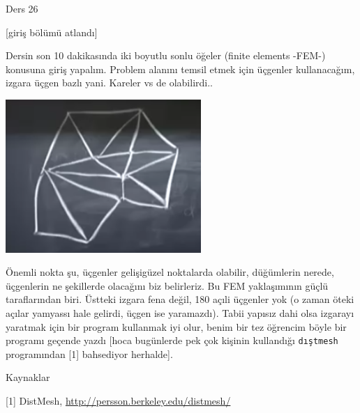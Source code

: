 \documentclass[12pt,fleqn]{article}\usepackage{../../common}
\begin{document}
Ders 26

[giriş bölümü atlandı]

Dersin son 10 dakikasında iki boyutlu sonlu öğeler (finite elements -FEM-)
konusuna giriş yapalım. Problem alanını temsil etmek için üçgenler kullanacağım,
izgara üçgen bazlı yani. Kareler vs de olabilirdi..

\includegraphics[width=20em]{compscieng_1_26_01.png}

Önemli nokta şu, üçgenler gelişigüzel noktalarda olabilir, düğümlerin nerede,
üçgenlerin ne şekillerde olacağını biz belirleriz. Bu FEM yaklaşımının güçlü
taraflarından biri. Üstteki izgara fena değil, 180 açıli üçgenler yok (o zaman
öteki açılar yamyassı hale gelirdi, üçgen ise yaramazdı). Tabii yapısız dahi
olsa izgarayı yaratmak için bir program kullanmak iyi olur, benim bir
tez öğrencim böyle bir programı geçende yazdı [hoca bugünlerde pek çok kişinin
kullandığı \verb!dıştmesh! programından [1] bahsediyor herhalde]. 
















Kaynaklar

[1] DistMesh, \url{http://persson.berkeley.edu/distmesh/}
\end{document}
